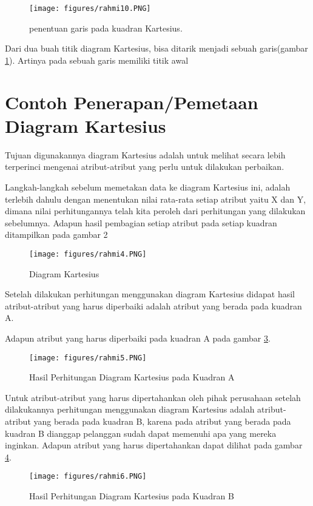 \begin{figure}[ht]
	\centerline{\texttt{[image: figures/rahmi10.PNG]}}
	\caption{penentuan garis pada kuadran Kartesius.}
	\label{rahmi10}
	\end{figure}

Dari dua buah titik diagram Kartesius, bisa ditarik menjadi sebuah garis(gambar \ref{rahmi10}). Artinya pada sebuah garis memiliki titik awal


\section{Contoh Penerapan/Pemetaan Diagram Kartesius}
Tujuan digunakannya diagram Kartesius adalah untuk melihat secara lebih terperinci mengenai atribut-atribut yang perlu untuk dilakukan perbaikan. 

Langkah-langkah sebelum memetakan data ke diagram Kartesius ini, adalah terlebih dahulu dengan menentukan nilai rata-rata setiap atribut yaitu X dan Y, 
dimana nilai perhitungannya telah kita peroleh dari perhitungan yang dilakukan sebelumnya.
Adapun hasil pembagian setiap atribut pada setiap kuadran ditampilkan pada gambar 2

\begin{figure}[ht]
	\centerline{\texttt{[image: figures/rahmi4.PNG]}}
	\caption{Diagram Kartesius}
	\label{rahmi4}
	\end{figure}

Setelah dilakukan perhitungan menggunakan diagram Kartesius didapat hasil atribut-atribut yang harus diperbaiki adalah atribut yang berada pada kuadran A.

Adapun atribut yang harus diperbaiki pada kuadran A pada gambar \ref{rahmi5}.


\begin{figure}[ht]
	\centerline{\texttt{[image: figures/rahmi5.PNG]}}
	\caption{Hasil Perhitungan Diagram Kartesius pada Kuadran A}
	\label{rahmi5}
	\end{figure}


Untuk atribut-atribut yang harus dipertahankan oleh pihak perusahaan setelah dilakukannya perhitungan menggunakan diagram Kartesius adalah atribut-atribut
yang berada pada kuadran B, karena pada atribut yang berada pada kuadran B dianggap pelanggan sudah dapat memenuhi apa yang mereka inginkan. 
Adapun atribut yang harus dipertahankan dapat dilihat pada gambar \ref{rahmi6}.



\begin{figure}[ht]
	\centerline{\texttt{[image: figures/rahmi6.PNG]}}
	\caption{Hasil Perhitungan Diagram Kartesius pada Kuadran B}
	\label{rahmi6}
	\end{figure}

